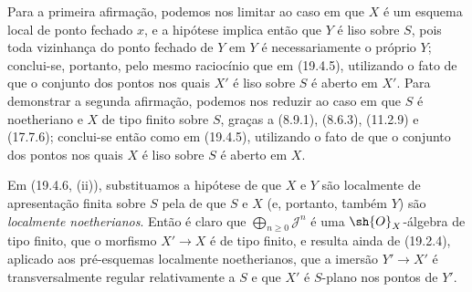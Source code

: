 Para a primeira afirmação, podemos nos limitar ao caso em que $X$ é um esquema local de ponto fechado $x$, e a hipótese implica então que $Y$ é liso sobre $S$, pois toda vizinhança do ponto fechado de $Y$ em $Y$ é necessariamente o próprio $Y$; conclui-se, portanto, pelo mesmo raciocínio que em (19.4.5), utilizando o fato de que o conjunto dos pontos nos quais $X'$ é liso sobre $S$ é aberto em $X'$. Para demonstrar a segunda afirmação, podemos nos reduzir ao caso em que $S$ é noetheriano e $X$ de tipo finito sobre $S$, graças a (8.9.1), (8.6.3), (11.2.9) e (17.7.6); conclui-se então como em (19.4.5), utilizando o fato de que o conjunto dos pontos nos quais $X$ é liso sobre $S$ é aberto em $X$.

\begin{remark}[19.4.10]
\label{IV.19.4.10}
Em (19.4.6, (ii)), substituamos a hipótese de que $X$ e $Y$ são localmente de apresentação finita sobre $S$ pela de que $S$ e $X$ (e, portanto, também $Y$) são \emph{localmente noetherianos}. Então é claro que $\bigoplus_{n\geq0}\mathscr J^n$ é uma $\sh{O}_X$-álgebra de tipo finito, que o morfismo $X'\to X$ é de tipo finito, e resulta ainda de (19.2.4), aplicado aos pré-esquemas localmente noetherianos, que a imersão $Y'\to X'$ é transversalmente regular relativamente a $S$ e que $X'$ é $S$-plano nos pontos de $Y'$.
\end{remark}

